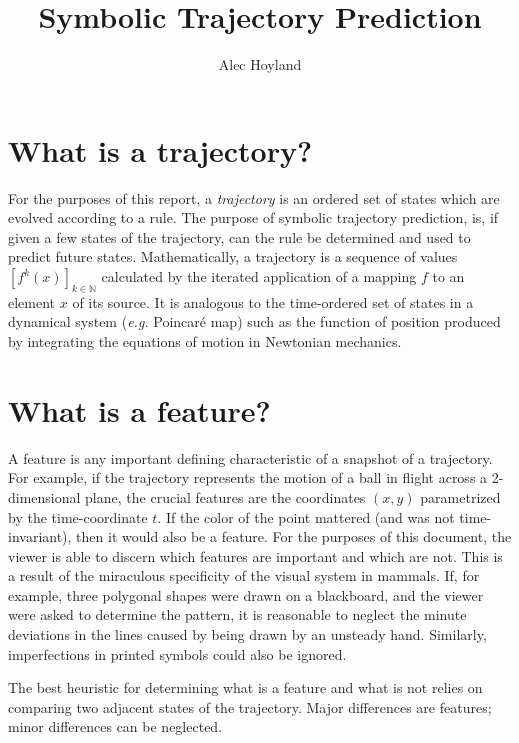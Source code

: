 \documentclass[]{article}
\title{Symbolic Trajectory Prediction}
\author{Alec Hoyland}
\begin{document}
\maketitle

\begin{abstract}

\end{abstract}

\section{What is a trajectory?}

For the purposes of this report, a \textit{trajectory} is an ordered set of states which are evolved according to a rule. The purpose of symbolic trajectory prediction, is, if given a few states of the trajectory, can the rule be determined and used to predict future states. Mathematically, a trajectory is a sequence of values $\left[ f^k(x) \right]_{k \in \mathbb{N}}$ calculated by the iterated application of a mapping $f$ to an element $x$ of its source. It is analogous to the time-ordered set of states in a dynamical system (\textit{e.g.} Poincar\'e map) such as the function of position produced by integrating the equations of motion in Newtonian mechanics.

\section{What is a feature?}

A feature is any important defining characteristic of a snapshot of a trajectory. For example, if the trajectory represents the motion of a ball in flight across a 2-dimensional plane, the crucial features are the coordinates $(x, y)$ parametrized by the time-coordinate $t$. If the color of the point mattered (and was not time-invariant), then it would also be a feature. For the purposes of this document, the viewer is able to discern which features are important and which are not. This is a result of the miraculous specificity of the visual system in mammals. If, for example, three polygonal shapes were drawn on a blackboard, and the viewer were asked to determine the pattern, it is reasonable to neglect the minute deviations in the lines caused by being drawn by an unsteady hand. Similarly, imperfections in printed symbols could also be ignored.

The best heuristic for determining what is a feature and what is not relies on comparing two adjacent states of the trajectory. Major differences are features; minor differences can be neglected.
\end{document}

